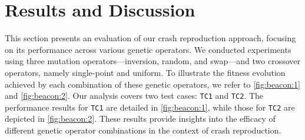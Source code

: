 \section{Results and Discussion}
\label{sec:results}
    This section presents an evaluation of our crash reproduction approach, focusing on its performance across various 
    genetic operators. We conducted experiments using three mutation operators—inversion, random, and swap—and two 
    crossover operators, namely single-point and uniform. To illustrate the fitness evolution achieved by each 
    combination of these genetic operators, we refer to \vref{fig:beacon:1} and \vref{fig:beacon:2}. Our 
    analysis covers two test cases: \texttt{TC1} and \texttt{TC2}. The performance results for \texttt{TC1} are detailed 
    in \vref{fig:beacon:1}, while those for \texttt{TC2} are depicted in \vref{fig:beacon:2}. 
    These results provide insights into the efficacy of different genetic 
    operator combinations in the context of crash reproduction.

